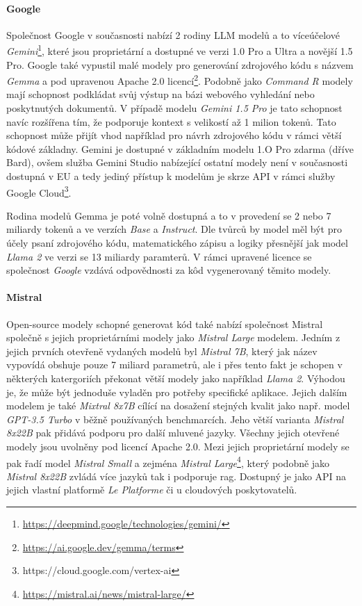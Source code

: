\documentclass[czech, ma, kiv, he, iso690numb, pdf, viewonly]{fasthesis}
\begin{document}
    \paragraph{Google} Společnost Google v současnosti nabízí 2 rodiny LLM modelů a to víceúčelové \textit{Gemini}\footnote{\url{https://deepmind.google/technologies/gemini/}}, které jsou proprietární a dostupné ve verzi 1.0 Pro a Ultra a novější 1.5 Pro. Google také vypustil malé modely pro generování zdrojového kódu s názvem \textit{Gemma} a pod upravenou Apache 2.0 licencí\footnote{\url{https://ai.google.dev/gemma/terms}}. Podobně jako \textit{Command R} modely mají schopnost podkládat svůj výstup na bázi webového vyhledání nebo poskytnutých dokumentů. V případě modelu \textit{Gemini 1.5 Pro} je tato schopnost navíc rozšířena tím, že podporuje kontext s velikostí až 1 milion tokenů. Tato schopnost může přijít vhod například pro návrh zdrojového kódu v rámci větší kódové základny. Gemini je dostupné v základním modelu 1.O Pro zdarma (dříve Bard), ovšem služba Gemini Studio nabízející ostatní modely není v současnosti dostupná v EU a tedy jediný přístup k modelům je skrze API v rámci služby Google Cloud\footnote{https://cloud.google.com/vertex-ai}.

    Rodina modelů Gemma je poté volně dostupná a to v provedení se 2 nebo 7 miliardy tokenů a ve verzích \textit{Base} a \textit{Instruct}. Dle tvůrců by model měl být pro účely psaní zdrojového kódu, matematického zápisu a logiky přesnější jak model \textit{Llama 2} ve verzi se 13 miliardy paramterů. \cite{gemma_introduction} V rámci upravené licence se společnost \textit{Google} vzdává odpovědnosti za kôd vygenerovaný těmito modely.

    \paragraph{Mistral} Open-source modely schopné generovat kód také nabízí společnost Mistral společně s jejich proprietárními modely jako \textit{Mistral Large} modelem. Jedním z jejich prvních otevřeně vydaných modelů byl \textit{Mistral 7B}, který jak název vypovídá obshuje pouze 7 miliard parametrů, ale i přes tento fakt je schopen v některých katergoriích překonat větší modely jako například \textit{Llama 2}. \cite{jiang2023mistral} Výhodou je, že může být jednoduše vyladěn pro potřeby specifické aplikace. Jejich dalším modelem je také \textit{Mixtral 8x7B} cílící na dosažení stejných kvalit jako např. model \textit{GPT-3.5 Turbo} v běžně používaných benchmarcích. Jeho větší varianta \textit{Mistral 8x22B} pak přidává podporu pro další mluvené jazyky. \cite{jiang2024mixtral} Všechny jejich otevřené modely jsou uvolněny pod licencí Apache 2.0. Mezi jejich proprietární modely se pak řadí model \textit{Mistral Small} a zejména \textit{Mistral Large}\footnote{\url{https://mistral.ai/news/mistral-large/}}, který podobně jako \textit{Mistral 8x22B} zvládá více jazyků tak i podporuje \Gls{rag}. Dostupný je jako API na jejich vlastní platformě \textit{Le Platforme} či u cloudových poskytovatelů.
\end{document}
